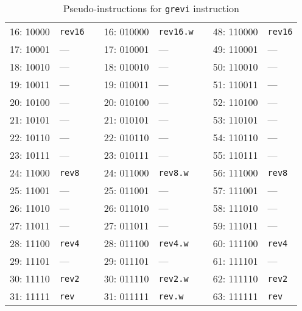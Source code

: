 \begin{table}[t]
\begin{small}
\begin{center}
\begin{tabular}{r l p{0.5in} r l p{0.3in} r l}
\cline{1-2}
\cline{4-5}
\cline{7-8}

16: 10000 & {\tt rev16}   &   & 16: 010000 & {\tt rev16.w} &   & 48: 110000 & {\tt rev16} \\
17: 10001 & ---           &   & 17: 010001 & ---           &   & 49: 110001 & ---         \\
18: 10010 & ---           &   & 18: 010010 & ---           &   & 50: 110010 & ---         \\
19: 10011 & ---           &   & 19: 010011 & ---           &   & 51: 110011 & ---         \\
20: 10100 & ---           &   & 20: 010100 & ---           &   & 52: 110100 & ---         \\
21: 10101 & ---           &   & 21: 010101 & ---           &   & 53: 110101 & ---         \\
22: 10110 & ---           &   & 22: 010110 & ---           &   & 54: 110110 & ---         \\
23: 10111 & ---           &   & 23: 010111 & ---           &   & 55: 110111 & ---         \\

\cline{1-2}
\cline{4-5}
\cline{7-8}

24: 11000 & {\tt rev8}    &   & 24: 011000 & {\tt rev8.w}  &   & 56: 111000 & {\tt rev8}  \\
25: 11001 & ---           &   & 25: 011001 & ---           &   & 57: 111001 & ---         \\
26: 11010 & ---           &   & 26: 011010 & ---           &   & 58: 111010 & ---         \\
27: 11011 & ---           &   & 27: 011011 & ---           &   & 59: 111011 & ---         \\
28: 11100 & {\tt rev4}    &   & 28: 011100 & {\tt rev4.w}  &   & 60: 111100 & {\tt rev4}  \\
29: 11101 & ---           &   & 29: 011101 & ---           &   & 61: 111101 & ---         \\
30: 11110 & {\tt rev2}    &   & 30: 011110 & {\tt rev2.w}  &   & 62: 111110 & {\tt rev2}  \\
31: 11111 & {\tt rev}     &   & 31: 011111 & {\tt rev.w}   &   & 63: 111111 & {\tt rev}   \\
\end{tabular}
\end{center}
\end{small}
\caption{Pseudo-instructions for {\tt grevi} instruction}
\label{grevi-modes}
\end{table}

